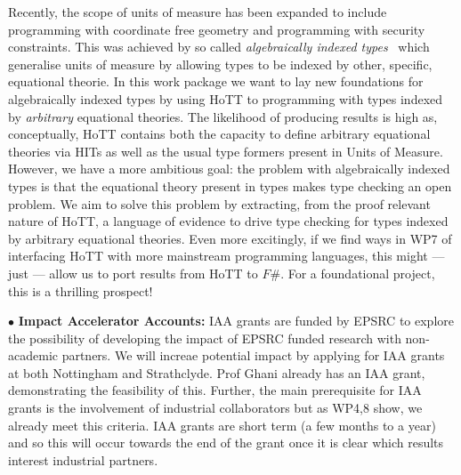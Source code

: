 \documentclass[a4paper,11pt]{article}
\begin{document}
Recently, the scope of units of measure has been expanded to include
programming with coordinate free geometry and programming with
security constraints. This was achieved by so called {\em
  algebraically indexed types}~\cite{ajk} which generalise units of
measure by allowing types to be indexed by other, specific, equational
theorie. In this work package we want to lay new foundations for
algebraically indexed types by using HoTT to programming with types
indexed by {\em arbitrary} equational theories. The likelihood of
producing results is high as, conceptually, HoTT contains both the
capacity to define arbitrary equational theories via HITs as well as
the usual type formers present in Units of Measure. However, we have a
more ambitious goal: the problem with algebraically indexed types is
that the equational theory present in types makes type checking an
open problem. We aim to solve this problem by extracting, from the proof
relevant nature of HoTT, a language of evidence to drive type checking
for types indexed by arbitrary equational theories. Even more
excitingly, if we find ways in WP7 of interfacing HoTT with more
mainstream programming languages, this might --- just --- allow us to port
results from HoTT to $F\#$.  For a foundational project, this is a
thrilling prospect!


\vspace*{0.02in}

$\bullet$ {\bf Impact Accelerator Accounts:} IAA grants are funded by
EPSRC to explore the possibility of
developing the impact of EPSRC funded research with non-academic
partners. We will increae potential impact 
by applying for IAA grants at both Nottingham and Strathclyde. Prof
Ghani already has an IAA grant, demonstrating the feasibility of
this. Further, the main prerequisite for IAA grants is the involvement
of industrial collaborators but as WP4,8 show, we already meet this
criteria. IAA grants are short term (a few months to a year)
and so this will occur towards the end of the grant once it is clear
which results interest industrial partners.

\vspace*{0.02in}
\end{document}
